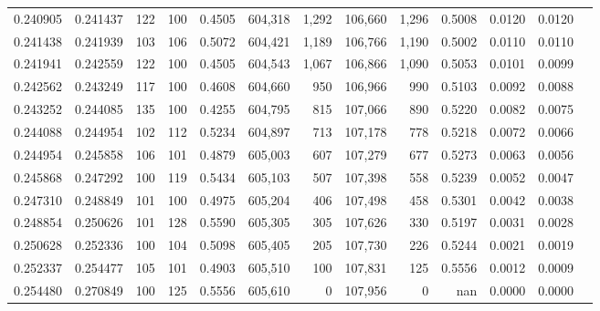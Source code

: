 \begin{tabular}{rrrrrrrrrrrrr}
0.240905 & 0.241437 &   122 & 100 &                                     0.4505 & 604,318 &   1,292 & 106,660 &   1,296 & 0.5008 & 0.0120 & 0.0120 \\
0.241438 & 0.241939 &   103 & 106 &                                     0.5072 & 604,421 &   1,189 & 106,766 &   1,190 & 0.5002 & 0.0110 & 0.0110 \\
0.241941 & 0.242559 &   122 & 100 &                                     0.4505 & 604,543 &   1,067 & 106,866 &   1,090 & 0.5053 & 0.0101 & 0.0099 \\
0.242562 & 0.243249 &   117 & 100 &                                     0.4608 & 604,660 &     950 & 106,966 &     990 & 0.5103 & 0.0092 & 0.0088 \\
0.243252 & 0.244085 &   135 & 100 &                                     0.4255 & 604,795 &     815 & 107,066 &     890 & 0.5220 & 0.0082 & 0.0075 \\
0.244088 & 0.244954 &   102 & 112 &                                     0.5234 & 604,897 &     713 & 107,178 &     778 & 0.5218 & 0.0072 & 0.0066 \\
0.244954 & 0.245858 &   106 & 101 &                                     0.4879 & 605,003 &     607 & 107,279 &     677 & 0.5273 & 0.0063 & 0.0056 \\
0.245868 & 0.247292 &   100 & 119 &                                     0.5434 & 605,103 &     507 & 107,398 &     558 & 0.5239 & 0.0052 & 0.0047 \\
0.247310 & 0.248849 &   101 & 100 &                                     0.4975 & 605,204 &     406 & 107,498 &     458 & 0.5301 & 0.0042 & 0.0038 \\
0.248854 & 0.250626 &   101 & 128 &                                     0.5590 & 605,305 &     305 & 107,626 &     330 & 0.5197 & 0.0031 & 0.0028 \\
0.250628 & 0.252336 &   100 & 104 &                                     0.5098 & 605,405 &     205 & 107,730 &     226 & 0.5244 & 0.0021 & 0.0019 \\
0.252337 & 0.254477 &   105 & 101 &                                     0.4903 & 605,510 &     100 & 107,831 &     125 & 0.5556 & 0.0012 & 0.0009 \\
0.254480 & 0.270849 &   100 & 125 &                                     0.5556 & 605,610 &       0 & 107,956 &       0 &    nan & 0.0000 & 0.0000 \\
\bottomrule
\end{tabular}
